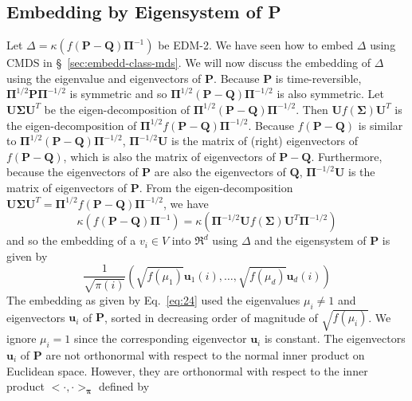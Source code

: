 \documentclass[10pt,twocolumn]{article}
\numberwithin{equation}{section}
\begin{document}
\subsection{Embedding by Eigensystem of P}
\label{sec:embedd-eigensyst-p}
Let $\Delta = \kappa(f(\mathbf{P} - \mathbf{Q})\bm{\Pi}^{-1})$ be
EDM-2. We have seen how to embed $\Delta$ using CMDS in
\S~\ref{sec:embedd-class-mds}. We will now discuss the embedding of
$\Delta$ using the eigenvalue and eigenvectors of
$\mathbf{P}$. Because $\mathbf{P}$ is time-reversible, $\bm{\Pi}^{1/2}
\mathbf{P} \bm{\Pi}^{-1/2}$ is symmetric and so
$\bm{\Pi}^{1/2}(\mathbf{P} - \mathbf{Q})\bm{\Pi}^{-1/2}$ is also
symmetric. Let $\mathbf{U} \bm{\Sigma} \mathbf{U}^{T}$ be the
eigen-decomposition of $\bm{\Pi}^{1/2}(\mathbf{P} -
\mathbf{Q})\bm{\Pi}^{-1/2}$. Then $\mathbf{U} f(\bm{\Sigma})
\mathbf{U}^{T}$ is the eigen-decomposition
of $\bm{\Pi}^{1/2} 
f(\mathbf{P} - \mathbf{Q}) \bm{\Pi}^{-1/2}$. Because $f(\mathbf{P} -
\mathbf{Q})$ is similar to $\bm{\Pi}^{1/2}(\mathbf{P} -
\mathbf{Q})\bm{\Pi}^{-1/2}$, $\bm{\Pi}^{-1/2}\mathbf{U}$ is the matrix
of (right) eigenvectors of $f(\mathbf{P} - \mathbf{Q})$, which is also
the matrix of eigenvectors of $\mathbf{P} - \mathbf{Q}$. Furthermore,
because the eigenvectors of $\mathbf{P}$ are also the eigenvectors of
$\mathbf{Q}$, $\bm{\Pi}^{-1/2}\mathbf{U}$ is the matrix of
eigenvectors of $\mathbf{P}$. From the eigen-decomposition
$\mathbf{U}\bm{\Sigma}\mathbf{U}^{T} =
\bm{\Pi}^{1/2}f(\mathbf{P}-\mathbf{Q})\bm{\Pi}^{-1/2}$, we have
\begin{equation*}
    \kappa(f(\mathbf{P} - \mathbf{Q})\bm{\Pi}^{-1})=
    \kappa(\bm{\Pi}^{-1/2}\mathbf{U}f(\bm{\Sigma})\mathbf{U}^{T}\bm{\Pi}^{-1/2})
\end{equation*}
and so the embedding of a $v_i \in V$ into $\Re^{d}$ using
$\Delta$ and the eigensystem of $\mathbf{P}$ is given by
\begin{equation}
  \label{eq:24}
   \frac{1}{\sqrt{\pi(i)}} (\sqrt{f(\mu_1)} \mathbf{u}_1(i),
    \dots, \sqrt{f(\mu_d)} \mathbf{u}_{d}(i))
\end{equation}
The embedding as given by Eq.~\eqref{eq:24} used the eigenvalues
$\mu_i \not= 1$ and eigenvectors $\mathbf{u}_i$ of $\mathbf{P}$,
sorted in decreasing order of magnitude of $\sqrt{f(\mu_i)}$. We
ignore $\mu_i = 1$ since the corresponding eigenvector $\mathbf{u}_i$
is constant. The eigenvectors $\mathbf{u}_i$ of $\mathbf{P}$ are not
orthonormal with respect to the normal inner product on Euclidean
space. However, they are orthonormal with respect to the inner product
$<\cdot,\cdot>_{\bm{\pi}}$ defined by
\end{document}
